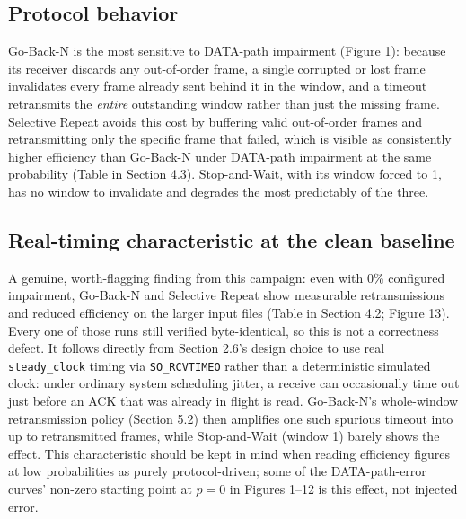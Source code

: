 \documentclass[11pt]{article}
\begin{document}
\subsection{Protocol behavior}
Go-Back-N is the most sensitive to DATA-path impairment (Figure 1): because its receiver discards
any out-of-order frame, a single corrupted or lost frame invalidates every frame already sent behind
it in the window, and a timeout retransmits the \emph{entire} outstanding window rather than just the
missing frame. Selective Repeat avoids this cost by buffering valid out-of-order frames and
retransmitting only the specific frame that failed, which is visible as consistently higher efficiency
than Go-Back-N under DATA-path impairment at the same probability (Table in Section 4.3).
Stop-and-Wait, with its window forced to 1, has no window to invalidate and degrades the most
predictably of the three.

\subsection{Real-timing characteristic at the clean baseline}
A genuine, worth-flagging finding from this campaign: even with 0\% configured impairment,
Go-Back-N and Selective Repeat show measurable retransmissions and reduced efficiency on the
larger input files (Table in Section 4.2; Figure 13). Every one of those runs still verified
byte-identical, so this is not a correctness defect. It follows directly from Section 2.6's design
choice to use real \texttt{steady\_clock} timing via \texttt{SO\_RCVTIMEO} rather than a
deterministic simulated clock: under ordinary system scheduling jitter, a receive can occasionally
time out just before an ACK that was already in flight is read. Go-Back-N's whole-window
retransmission policy (Section 5.2) then amplifies one such spurious timeout into up to
\WindowSize{} retransmitted frames, while Stop-and-Wait (window 1) barely shows the effect. This
characteristic should be kept in mind when reading efficiency figures at low probabilities as purely
protocol-driven; some of the DATA-path-error curves' non-zero starting point at $p=0$ in Figures
1--12 is this effect, not injected error.
\end{document}
